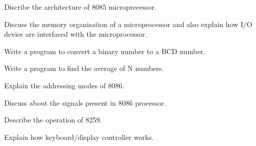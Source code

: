 \markB
\partC

\item Discribe the architecture of 8085 microprecessor.
\Or
\item Discuss the memory organisation of a microprocessor and also explain how I/O devies are interfaced with
  the microprocessor.

\newpage\again

\item Write a program to convert a binary number to a BCD number.
\Or
\item Write a program to find the average of N numbers.

\item Explain the addressing modes of 8086.
\Or
\item Discuss about the signals present in 8086 processor.

\item Describe the operation of 8259.
\Or
\item Explain how keyboard/display controller works.

\markC
\ene
